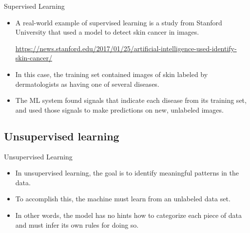 \documentclass{beamer}
\begin{document}
\begin{frame}{Supervised Learning}

\begin{itemize}

\item A real-world example of supervised learning is a study from Stanford University that used a model to detect skin cancer in images. 

\medskip
\url{https://news.stanford.edu/2017/01/25/artificial-intelligence-used-identify-skin-cancer/}

\item In this case, the training set contained images of skin labeled by dermatologists as having one of several diseases. 

\item The ML system found signals that indicate each disease from its training set, and used those signals to make predictions on new, unlabeled images.

\end{itemize}

\end{frame}


\subsection{Unsupervised learning}

\begin{frame}{Unsupervised Learning}

\begin{itemize}

\item In unsupervised learning, the goal is to identify meaningful patterns in the data. 

\item To accomplish this, the machine must learn from an unlabeled data set. 

\item In other words, the model has no hints how to categorize each piece of data and must infer its own rules for doing so.

\end{itemize}

\end{frame}

\end{document}
